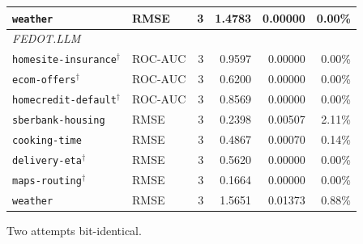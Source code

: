 \begin{table}[t]
\begin{tabular}{llrrrr}
\texttt{weather} & RMSE & 3 & 1.4783 & 0.00000 & 0.00\% \\
\midrule
\multicolumn{6}{l}{\itshape FEDOT.LLM} \\
\texttt{homesite-insurance}$^{\dagger}$ & ROC-AUC & 3 & 0.9597 & 0.00000 & 0.00\% \\
\texttt{ecom-offers}$^{\dagger}$ & ROC-AUC & 3 & 0.6200 & 0.00000 & 0.00\% \\
\texttt{homecredit-default}$^{\dagger}$ & ROC-AUC & 3 & 0.8569 & 0.00000 & 0.00\% \\
\texttt{sberbank-housing} & RMSE & 3 & 0.2398 & 0.00507 & 2.11\% \\
\texttt{cooking-time} & RMSE & 3 & 0.4867 & 0.00070 & 0.14\% \\
\texttt{delivery-eta}$^{\dagger}$ & RMSE & 3 & 0.5620 & 0.00000 & 0.00\% \\
\texttt{maps-routing}$^{\dagger}$ & RMSE & 3 & 0.1664 & 0.00000 & 0.00\% \\
\texttt{weather} & RMSE & 3 & 1.5651 & 0.01373 & 0.88\% \\
\bottomrule
\end{tabular}
\begin{tablenotes}\footnotesize
\item[$\dagger$] Two attempts bit-identical.
\end{tablenotes}
\end{table}
